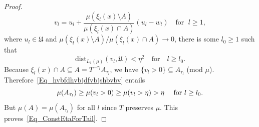 \documentclass[AHL,Unicode,longabstracts]{cedram}
\newcommand{\dist}{\mathrm{dist}}
\newcommand{\frkU}{\mathfrak{U}}
\begin{document}
\begin{proof}
\[
v_{l}=u_{l}+\frac{\mu(\xi_{l}(x)\setminus A)}{\mu(\xi_{l}(x)\cap A)} (u_{l}-w_{l})\quad \text{for }\;l\geq1,
\]
where $u_{l}\in\frkU$ and $\mu(\xi_{l}(x)\setminus A)/\mu(\xi _{l}(x)\cap A)\rightarrow0$, there is some $l_{0}\geq1$ such that
\[
\dist_{L_{1}(\mu)}\left(v_{l},\frkU\right)<\eta^{2}\quad\text{for}\quad l\geq l_{0}.
\]
Because $\xi_{l}(x)\cap A\subseteq A=T^{-\tau_{l}}A_{\tau_{l}}$, we have $\{v_{l}>0\}\subseteq A_{\tau_{l}}$ (mod $\mu$). Therefore~\eqref{Eq_hvbfdhvbjdfvbjshbvbv} entails
\[
\mu(A_{\tau_{l}})\geq\mu(v_{l}>0)\geq\mu(v_{l}>\eta)>\eta\text{ \quad for }l\geq l_{0}\text{.}
\]
But $\mu(A)=\mu(A_{\tau_{l}})$ for all $l$ since $T$ preserves $\mu$. This proves~\eqref{Eq_ConstEtaForTail}.\qedhere
\end{proof}



\end{document}
